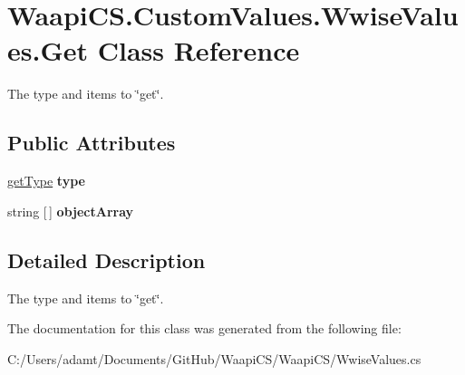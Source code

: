 \hypertarget{class_waapi_c_s_1_1_custom_values_1_1_wwise_values_1_1_get}{}\section{Waapi\+C\+S.\+Custom\+Values.\+Wwise\+Values.\+Get Class Reference}
\label{class_waapi_c_s_1_1_custom_values_1_1_wwise_values_1_1_get}


The type and items to \char`\"{}get\char`\"{}.  


\subsection*{Public Attributes}
\begin{DoxyCompactItemize}
\item 
\mbox{\label{class_waapi_c_s_1_1_custom_values_1_1_wwise_values_1_1_get_a7d78cd608a73322d346bba5d26179c09}} 
\mbox{\hyperlink{class_waapi_c_s_1_1_custom_values_1_1_wwise_values_a965953df32cac96b44c500990fcfd5d2}{get\+Type}} {\bfseries type}
\item 
\mbox{\label{class_waapi_c_s_1_1_custom_values_1_1_wwise_values_1_1_get_a0c5494cceccf34812a569459030b71aa}} 
string \mbox{[}$\,$\mbox{]} {\bfseries object\+Array}
\end{DoxyCompactItemize}


\subsection{Detailed Description}
The type and items to \char`\"{}get\char`\"{}. 



The documentation for this class was generated from the following file\+:\begin{DoxyCompactItemize}
\item 
C\+:/\+Users/adamt/\+Documents/\+Git\+Hub/\+Waapi\+C\+S/\+Waapi\+C\+S/Wwise\+Values.\+cs\end{DoxyCompactItemize}
